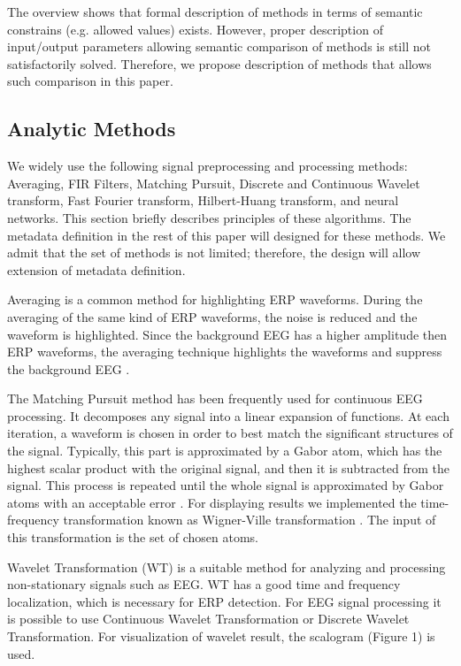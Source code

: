 \documentclass[a4paper,twoside]{article}
\begin{document}
The overview shows that formal description of methods in terms of semantic constrains (e.g. allowed values) exists. However, proper description of input/output parameters allowing semantic comparison of methods is still not satisfactorily solved. Therefore, we propose description of methods that allows such comparison in this paper.


\subsection{Analytic Methods}

\noindent We widely use the following signal preprocessing and processing methods: Averaging, FIR Filters, Matching Pursuit, Discrete and Continuous Wavelet transform, Fast Fourier transform, Hilbert-Huang transform, and neural networks. This section briefly describes principles of these algorithms. The metadata definition in the rest of this paper will designed for these methods. We admit that the set of methods is not limited; therefore, the design will allow extension of metadata definition.

Averaging \cite{Sanei07} is a common method for highlighting ERP waveforms. During the averaging of  the  same  kind  of  ERP  waveforms,  the  noise  is  reduced  and  the  waveform  is  highlighted. Since the background  EEG  has a higher  amplitude  then  ERP  waveforms, the averaging technique highlights the waveforms and suppress the background EEG \cite{Vidal77}.

The Matching Pursuit method has been frequently used for continuous EEG processing. It decomposes any signal into a linear expansion of functions. At each iteration, a waveform is chosen in order to best match the
significant structures of the signal. Typically, this part is approximated by a Gabor atom, which has the highest scalar
product with the original signal, and then it is subtracted from the signal. This process is repeated until the whole signal is
approximated by Gabor atoms with an acceptable error \cite{Vareka12}. For displaying results we implemented the time-frequency
transformation known as Wigner-Ville transformation \cite{Quian02}. The input of this transformation is the set of chosen atoms.

Wavelet Transformation (WT) \cite{Ciniburk10} is a suitable method for analyzing and processing non-stationary signals such as EEG.
WT has a good time and frequency localization, which is necessary for ERP detection. For EEG signal processing it is
possible to use Continuous Wavelet Transformation or Discrete Wavelet Transformation. For visualization of wavelet result, the scalogram (Figure 1) is used.
\end{document}
